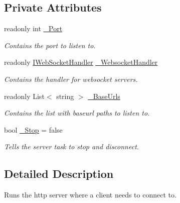 \subsection*{Private Attributes}
\begin{DoxyCompactItemize}
\item 
readonly int \mbox{\hyperlink{class_simple_web_socket_server_library_1_1_simple_web_socket_http_server_1_1_web_socket_http_server_abe8db2f7583ba87d2731ca04a751ed28}{\+\_\+\+Port}}
\begin{DoxyCompactList}\small\item\em Contains the port to listen to. \end{DoxyCompactList}\item 
readonly \mbox{\hyperlink{interface_simple_web_socket_server_library_1_1_simple_web_socket_handler_1_1_i_web_socket_handler}{I\+Web\+Socket\+Handler}} \mbox{\hyperlink{class_simple_web_socket_server_library_1_1_simple_web_socket_http_server_1_1_web_socket_http_server_a4de0d450cb58e0ddabc5a270dd7806c8}{\+\_\+\+Websocket\+Handler}}
\begin{DoxyCompactList}\small\item\em Contains the handler for websocket servers. \end{DoxyCompactList}\item 
readonly List$<$ string $>$ \mbox{\hyperlink{class_simple_web_socket_server_library_1_1_simple_web_socket_http_server_1_1_web_socket_http_server_a70e5c60e525049aed662d4f174413f43}{\+\_\+\+Base\+Urls}}
\begin{DoxyCompactList}\small\item\em Contains the list with baseurl paths to listen to. \end{DoxyCompactList}\item 
bool \mbox{\hyperlink{class_simple_web_socket_server_library_1_1_simple_web_socket_http_server_1_1_web_socket_http_server_ae945702bb623e9f65e14f23668c86cb1}{\+\_\+\+Stop}} = false
\begin{DoxyCompactList}\small\item\em Tells the server task to stop and disconnect. \end{DoxyCompactList}\end{DoxyCompactItemize}


\subsection{Detailed Description}
Runs the http server where a client needs to connect to. 



